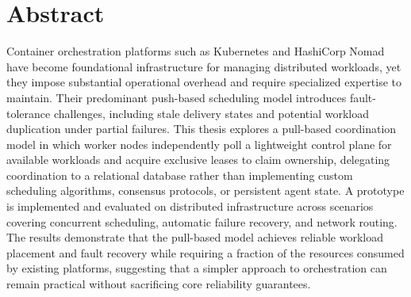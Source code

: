 \chapter*{Abstract}

Container orchestration platforms such as Kubernetes and HashiCorp Nomad have become foundational infrastructure for managing distributed workloads, yet they impose substantial operational overhead and require specialized expertise to maintain. Their predominant push-based scheduling model introduces fault-tolerance challenges, including stale delivery states and potential workload duplication under partial failures. This thesis explores a pull-based coordination model in which worker nodes independently poll a lightweight control plane for available workloads and acquire exclusive leases to claim ownership, delegating coordination to a relational database rather than implementing custom scheduling algorithms, consensus protocols, or persistent agent state. A prototype is implemented and evaluated on distributed infrastructure across scenarios covering concurrent scheduling, automatic failure recovery, and network routing. The results demonstrate that the pull-based model achieves reliable workload placement and fault recovery while requiring a fraction of the resources consumed by existing platforms, suggesting that a simpler approach to orchestration can remain practical without sacrificing core reliability guarantees.